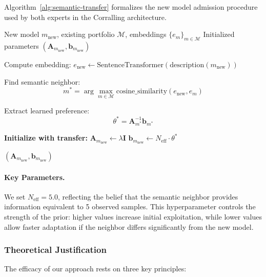 Algorithm~\ref{alg:semantic-transfer} formalizes the new model admission procedure used by both experts in the Corralling architecture.

\begin{algorithm}[t]
\caption{Semantic Transfer for New Model Admission}
\label{alg:semantic-transfer}
\begin{algorithmic}[1]
\REQUIRE New model $m_{\text{new}}$, existing portfolio $\mathcal{M}$, embeddings $\{e_m\}_{m \in \mathcal{M}}$
\ENSURE Initialized parameters $(\mathbf{A}_{m_{\text{new}}}, \mathbf{b}_{m_{\text{new}}})$

\STATE Compute embedding: $e_{\text{new}} \leftarrow \text{SentenceTransformer}(\text{description}(m_{\text{new}}))$

\STATE Find semantic neighbor:
\[
m^* = \arg\max_{m \in \mathcal{M}} \text{cosine\_similarity}(e_{\text{new}}, e_m)
\]

\STATE Extract learned preference:
\[
\theta^* = \mathbf{A}_{m^*}^{-1} \mathbf{b}_{m^*}
\]

\STATE \textbf{Initialize with transfer:}
\STATE \quad $\mathbf{A}_{m_{\text{new}}} \leftarrow \lambda \mathbf{I}$ 
\STATE \quad $\mathbf{b}_{m_{\text{new}}} \leftarrow N_{\text{eff}} \cdot \theta^*$ 

\RETURN $(\mathbf{A}_{m_{\text{new}}}, \mathbf{b}_{m_{\text{new}}})$
\end{algorithmic}
\end{algorithm}

\paragraph{Key Parameters.}
We set $N_{\text{eff}} = 5.0$, reflecting the belief that the semantic neighbor provides information equivalent to 5 observed samples. This hyperparameter controls the strength of the prior: higher values increase initial exploitation, while lower values allow faster adaptation if the neighbor differs significantly from the new model.

\subsubsection{Theoretical Justification}

The efficacy of our approach rests on three key principles:

